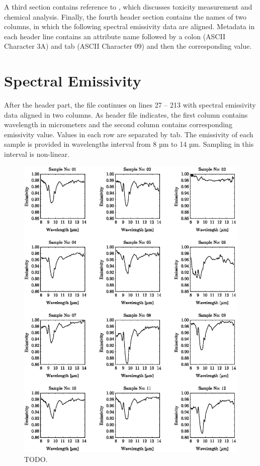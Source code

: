 \begin{appendices}
A third section contains reference to \cite{FK05}, which discusses toxicity measurement and chemical analysis. Finally, the fourth header section contains the names of two columns, in which the following spectral emissivity data are aligned. Metadata in each header line contains an attribute name followed by a colon (ASCII Character 3A) and tab (ASCII Character 09) and then the corresponding value.

\section{Spectral Emissivity}

After the header part, the file continues on lines 27 – 213 with spectral emissivity data aligned in two columns. As header file indicates, the first column contains wavelength in micrometers and the second column contains corresponding emissivity value. Values in each row are separated by tab. The emissivity of each sample is provided in wavelengths interval from 8 µm to 14 µm. Sampling in this interval is non-linear.

\begin{figure}[!t]
\centering
\includegraphics[width=0.95\linewidth]{pics/Chapter_05/spectral_library_pt1.eps}
\vspace{1.5 em}
\caption{TODO.}
\label{fig:SpoilSubstratesPreviewPt1}
\end{figure}


\end{appendices}
